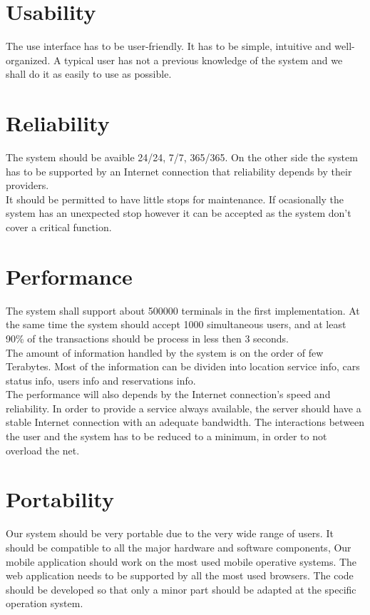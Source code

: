 \section{Usability}
\label{sec:usability}
 The use interface has to be user-friendly. It has to be simple, intuitive and well-organized. A typical user has not a previous knowledge of the system and we shall do it as easily to use as possible.

\section{Reliability}
The system should be avaible 24/24, 7/7, 365/365. On the other side the system has to be supported by an Internet connection that reliability depends by their providers. 
\\It should be permitted to have little stops for maintenance. If ocasionally the system has an unexpected stop however it can be accepted as the system don't cover a critical function.

\section{Performance}
The system shall support about 500000 terminals in the first implementation. At the same time the system should accept 1000 simultaneous users, and at least 90\% of the transactions should be process in less then 3 seconds.
\\The amount of information handled by the system is on the order of few Terabytes. Most of the information can be dividen into location service info, cars status info, users info and reservations info.
\\The performance will also depends by the Internet connection’s speed and reliability. In order to provide a service always available, the server should have a stable Internet connection with an adequate bandwidth.
The interactions between the user and the system has to be reduced to a minimum, in order to not overload the net. 

\section{Portability}
Our system should be very portable due to the very wide range of users. It should be compatible to all the major hardware and software components, Our mobile application should work on the most used mobile operative systems. The web application needs to be supported by all the most used browsers. The code should be developed so that only a minor part should be adapted at the specific operation system.

